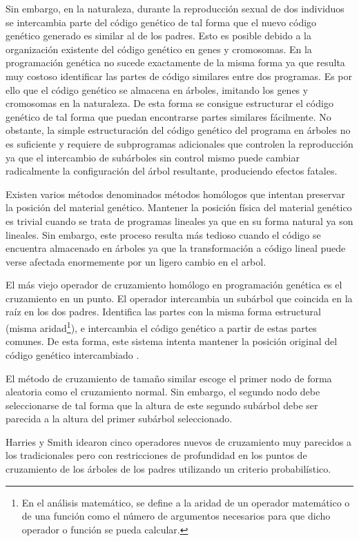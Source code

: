Sin embargo, en la naturaleza, durante la reproducción sexual de dos individuos se intercambia parte del código
genético de tal forma que el nuevo código genético generado es similar al de los padres. Esto es posible debido
a la organización existente del código genético en genes y cromosomas. En la programación genética  no sucede
exactamente de la misma forma ya que resulta muy costoso identificar las partes de código similares entre dos
programas. Es por ello que el código genético se almacena en árboles, imitando los genes y cromosomas en la
naturaleza. De esta forma se consigue estructurar el código genético de tal forma que puedan encontrarse partes
similares fácilmente. No obstante, la simple estructuración del código genético del programa en árboles no es
suficiente y requiere de subprogramas adicionales que controlen la reproducción ya que el intercambio de
subárboles sin control mismo puede cambiar radicalmente la configuración del árbol resultante, produciendo
efectos fatales.

Existen varios métodos denominados métodos homólogos que intentan preservar la
posición del material genético. Mantener la posición física del material
genético es trivial cuando se trata de programas lineales ya que en su forma
natural ya son lineales. Sin embargo, este proceso resulta más tedioso cuando
el código se encuentra almacenado en árboles ya que la transformación a código
lineal puede verse afectada enormemente por un ligero cambio en el arbol.

El más viejo operador de cruzamiento homólogo en programación genética es el
cruzamiento en un punto. El operador intercambia un subárbol que coincida en la
raíz en los dos padres. Identifica las partes con la misma forma estructural
(misma aridad\footnote{En el análisis matemático, se define a la aridad de un
operador matemático o de una función como el número de argumentos necesarios para
que dicho operador o función se pueda calcular.}), e intercambia el código
genético a partir de estas partes comunes. De esta forma, este sistema intenta
mantener la posición original del código genético intercambiado
\cite{LangdonPoli:2002}.

El método de cruzamiento de tamaño similar escoge el primer nodo de forma aleatoria como el cruzamiento normal.
Sin embargo, el segundo nodo debe seleccionarse de tal forma que la altura de este segundo subárbol debe ser
parecida a la altura del primer subárbol seleccionado.
 
Harries y Smith \cite{HarriesSmith:1997} idearon cinco operadores nuevos de
cruzamiento muy parecidos a los tradicionales pero con restricciones de profundidad en los puntos de cruzamiento de los árboles de los padres utilizando un criterio
probabilístico.

